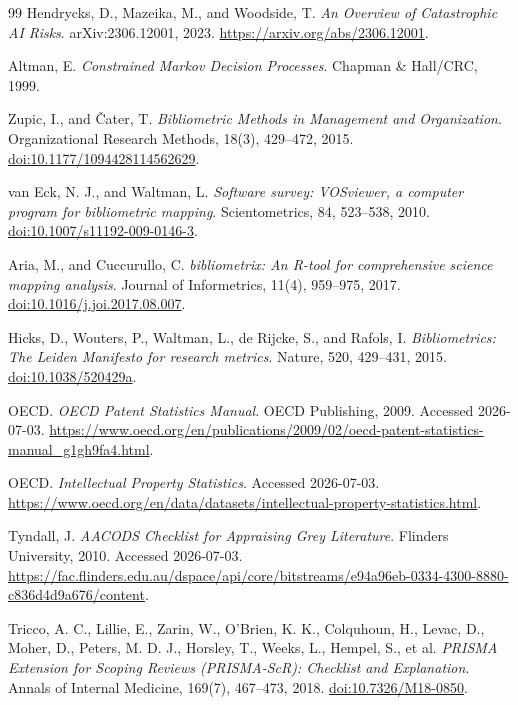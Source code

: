 \documentclass[11pt]{article}
\begin{document}
\begin{thebibliography}{99}
Hendrycks, D., Mazeika, M., and Woodside, T. \textit{An Overview of Catastrophic AI Risks}. arXiv:2306.12001, 2023. \url{https://arxiv.org/abs/2306.12001}.

Altman, E. \textit{Constrained Markov Decision Processes}. Chapman \& Hall/CRC, 1999.

Zupic, I., and \v{C}ater, T. \textit{Bibliometric Methods in Management and Organization}. Organizational Research Methods, 18(3), 429--472, 2015. \href{https://doi.org/10.1177/1094428114562629}{doi:10.1177/1094428114562629}.

van Eck, N. J., and Waltman, L. \textit{Software survey: VOSviewer, a computer program for bibliometric mapping}. Scientometrics, 84, 523--538, 2010. \href{https://doi.org/10.1007/s11192-009-0146-3}{doi:10.1007/s11192-009-0146-3}.

Aria, M., and Cuccurullo, C. \textit{bibliometrix: An R-tool for comprehensive science mapping analysis}. Journal of Informetrics, 11(4), 959--975, 2017. \href{https://doi.org/10.1016/j.joi.2017.08.007}{doi:10.1016/j.joi.2017.08.007}.

Hicks, D., Wouters, P., Waltman, L., de Rijcke, S., and Rafols, I. \textit{Bibliometrics: The Leiden Manifesto for research metrics}. Nature, 520, 429--431, 2015. \href{https://doi.org/10.1038/520429a}{doi:10.1038/520429a}.

OECD. \textit{OECD Patent Statistics Manual}. OECD Publishing, 2009. Accessed 2026-07-03. \url{https://www.oecd.org/en/publications/2009/02/oecd-patent-statistics-manual_g1gh9fa4.html}.

OECD. \textit{Intellectual Property Statistics}. Accessed 2026-07-03. \url{https://www.oecd.org/en/data/datasets/intellectual-property-statistics.html}.

Tyndall, J. \textit{AACODS Checklist for Appraising Grey Literature}. Flinders University, 2010. Accessed 2026-07-03. \url{https://fac.flinders.edu.au/dspace/api/core/bitstreams/e94a96eb-0334-4300-8880-c836d4d9a676/content}.

Tricco, A. C., Lillie, E., Zarin, W., O'Brien, K. K., Colquhoun, H., Levac, D., Moher, D., Peters, M. D. J., Horsley, T., Weeks, L., Hempel, S., et al. \textit{PRISMA Extension for Scoping Reviews (PRISMA-ScR): Checklist and Explanation}. Annals of Internal Medicine, 169(7), 467--473, 2018. \href{https://doi.org/10.7326/M18-0850}{doi:10.7326/M18-0850}.


\end{thebibliography}
\end{document}
